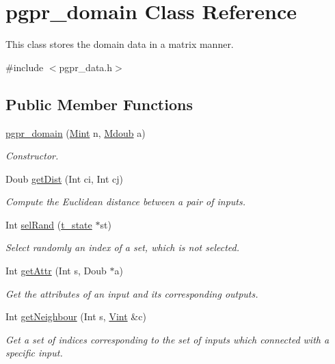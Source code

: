 \hypertarget{classpgpr__domain}{\section{pgpr\+\_\+domain Class Reference}
\label{classpgpr__domain}
}


This class stores the domain data in a matrix manner.  




{\ttfamily \#include $<$pgpr\+\_\+data.\+h$>$}

\subsection*{Public Member Functions}
\begin{DoxyCompactItemize}
\item 
\hyperlink{classpgpr__domain_ac527084df0c657962f29a554da0b3eea}{pgpr\+\_\+domain} (\hyperlink{classpgpr__matrix}{Mint} n, \hyperlink{classpgpr__matrix}{Mdoub} a)
\begin{DoxyCompactList}\small\item\em Constructor. \end{DoxyCompactList}\item 
Doub \hyperlink{classpgpr__domain_ac24189f56e27aad49dee703f5a58cc9b}{get\+Dist} (Int ci, Int cj)
\begin{DoxyCompactList}\small\item\em Compute the Euclidean distance between a pair of inputs. \end{DoxyCompactList}\item 
Int \hyperlink{classpgpr__domain_a814453a62ebc1ae9b4e420323bf013c2}{sel\+Rand} (\hyperlink{structt__state}{t\+\_\+state} $\ast$st)
\begin{DoxyCompactList}\small\item\em Select randomly an index of a set, which is not selected. \end{DoxyCompactList}\item 
Int \hyperlink{classpgpr__domain_a55b740e3d3a4a0c5bf86cd14895cd76b}{get\+Attr} (Int s, Doub $\ast$a)
\begin{DoxyCompactList}\small\item\em Get the attributes of an input and its corresponding outputs. \end{DoxyCompactList}\item 
Int \hyperlink{classpgpr__domain_ae07953124466fffafd45013bd7917ddd}{get\+Neighbour} (Int s, \hyperlink{classpgpr__vector}{Vint} \&c)
\begin{DoxyCompactList}\small\item\em Get a set of indices corresponding to the set of inputs which connected with a specific input. \end{DoxyCompactList}\end{DoxyCompactItemize}
